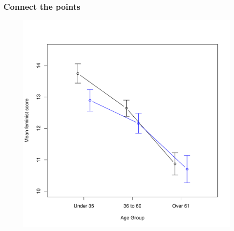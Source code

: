 \documentclass{beamer}\usepackage[]{graphicx}\usepackage[]{color}
\begin{document}
\begin{frame}[fragile]
  \frametitle{Connect the points}

\begin{figure}[h]
  \vspace{-20pt}
  \centering
  \includegraphics[height = 0.7\textwidth, keepaspectratio]{Figure/m10}
  \label{fig:m10}
\end{figure}
\end{frame} 
\end{document}
